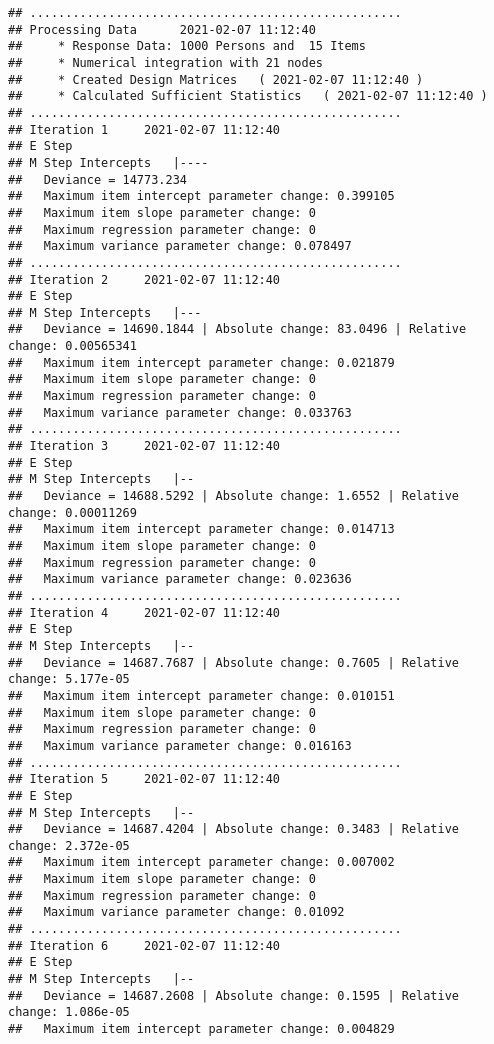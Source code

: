 \documentclass[
]{book}
\begin{document}
\begin{verbatim}
## ....................................................
## Processing Data      2021-02-07 11:12:40 
##     * Response Data: 1000 Persons and  15 Items 
##     * Numerical integration with 21 nodes
##     * Created Design Matrices   ( 2021-02-07 11:12:40 )
##     * Calculated Sufficient Statistics   ( 2021-02-07 11:12:40 )
## ....................................................
## Iteration 1     2021-02-07 11:12:40
## E Step
## M Step Intercepts   |----
##   Deviance = 14773.234
##   Maximum item intercept parameter change: 0.399105
##   Maximum item slope parameter change: 0
##   Maximum regression parameter change: 0
##   Maximum variance parameter change: 0.078497
## ....................................................
## Iteration 2     2021-02-07 11:12:40
## E Step
## M Step Intercepts   |---
##   Deviance = 14690.1844 | Absolute change: 83.0496 | Relative change: 0.00565341
##   Maximum item intercept parameter change: 0.021879
##   Maximum item slope parameter change: 0
##   Maximum regression parameter change: 0
##   Maximum variance parameter change: 0.033763
## ....................................................
## Iteration 3     2021-02-07 11:12:40
## E Step
## M Step Intercepts   |--
##   Deviance = 14688.5292 | Absolute change: 1.6552 | Relative change: 0.00011269
##   Maximum item intercept parameter change: 0.014713
##   Maximum item slope parameter change: 0
##   Maximum regression parameter change: 0
##   Maximum variance parameter change: 0.023636
## ....................................................
## Iteration 4     2021-02-07 11:12:40
## E Step
## M Step Intercepts   |--
##   Deviance = 14687.7687 | Absolute change: 0.7605 | Relative change: 5.177e-05
##   Maximum item intercept parameter change: 0.010151
##   Maximum item slope parameter change: 0
##   Maximum regression parameter change: 0
##   Maximum variance parameter change: 0.016163
## ....................................................
## Iteration 5     2021-02-07 11:12:40
## E Step
## M Step Intercepts   |--
##   Deviance = 14687.4204 | Absolute change: 0.3483 | Relative change: 2.372e-05
##   Maximum item intercept parameter change: 0.007002
##   Maximum item slope parameter change: 0
##   Maximum regression parameter change: 0
##   Maximum variance parameter change: 0.01092
## ....................................................
## Iteration 6     2021-02-07 11:12:40
## E Step
## M Step Intercepts   |--
##   Deviance = 14687.2608 | Absolute change: 0.1595 | Relative change: 1.086e-05
##   Maximum item intercept parameter change: 0.004829

\end{verbatim}
\end{document}
